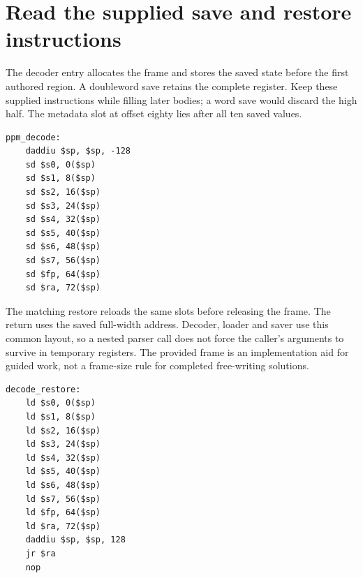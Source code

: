 \section{Read the supplied save and restore instructions}
The decoder entry allocates the frame and stores the saved state before the first
authored region. A doubleword save retains the complete register. Keep these supplied
instructions while filling later bodies; a word save would discard the high half.
The metadata slot at offset eighty lies after all ten saved values.

\begin{verbatim}
ppm_decode:
    daddiu $sp, $sp, -128
    sd $s0, 0($sp)
    sd $s1, 8($sp)
    sd $s2, 16($sp)
    sd $s3, 24($sp)
    sd $s4, 32($sp)
    sd $s5, 40($sp)
    sd $s6, 48($sp)
    sd $s7, 56($sp)
    sd $fp, 64($sp)
    sd $ra, 72($sp)
\end{verbatim}

The matching restore reloads the same slots before releasing the frame. The return
uses the saved full-width address. Decoder, loader and saver use this common layout,
so a nested parser call does not force the caller's arguments to survive in temporary
registers. The provided frame is an implementation aid for guided work, not a frame-size
rule for completed free-writing solutions.

\begin{verbatim}
decode_restore:
    ld $s0, 0($sp)
    ld $s1, 8($sp)
    ld $s2, 16($sp)
    ld $s3, 24($sp)
    ld $s4, 32($sp)
    ld $s5, 40($sp)
    ld $s6, 48($sp)
    ld $s7, 56($sp)
    ld $fp, 64($sp)
    ld $ra, 72($sp)
    daddiu $sp, $sp, 128
    jr $ra
    nop
\end{verbatim}
